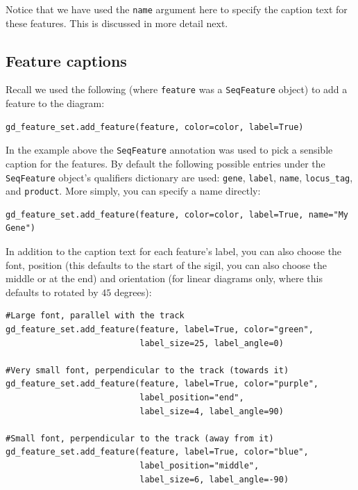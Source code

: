 \documentclass{report}
\begin{document}
Notice that we have used the \texttt{name} argument here to specify the
caption text for these features.  This is discussed in more detail next.

\subsection{Feature captions}
\label{sec:gd_feature_captions}

Recall we used the following (where \texttt{feature} was a
\verb|SeqFeature| object) to add a feature to the diagram:

\begin{verbatim}
gd_feature_set.add_feature(feature, color=color, label=True)
\end{verbatim}

In the example above the \verb|SeqFeature| annotation was used to pick a
sensible caption for the features.  By default the following possible entries
under the \verb|SeqFeature| object's qualifiers dictionary are used:
\texttt{gene}, \texttt{label}, \texttt{name}, \texttt{locus\_tag}, and
\texttt{product}.  More simply, you can specify a name directly:

\begin{verbatim}
gd_feature_set.add_feature(feature, color=color, label=True, name="My Gene")
\end{verbatim}

In addition to the caption text for each feature's label, you can also choose
the font, position (this defaults to the start of the sigil, you can also
choose the middle or at the end) and orientation (for linear diagrams only,
where this defaults to rotated by $45$ degrees):

\begin{verbatim}
#Large font, parallel with the track
gd_feature_set.add_feature(feature, label=True, color="green",
                           label_size=25, label_angle=0)

#Very small font, perpendicular to the track (towards it)
gd_feature_set.add_feature(feature, label=True, color="purple",
                           label_position="end",
                           label_size=4, label_angle=90)

#Small font, perpendicular to the track (away from it)
gd_feature_set.add_feature(feature, label=True, color="blue",
                           label_position="middle",
                           label_size=6, label_angle=-90)
\end{verbatim}
\end{document}
